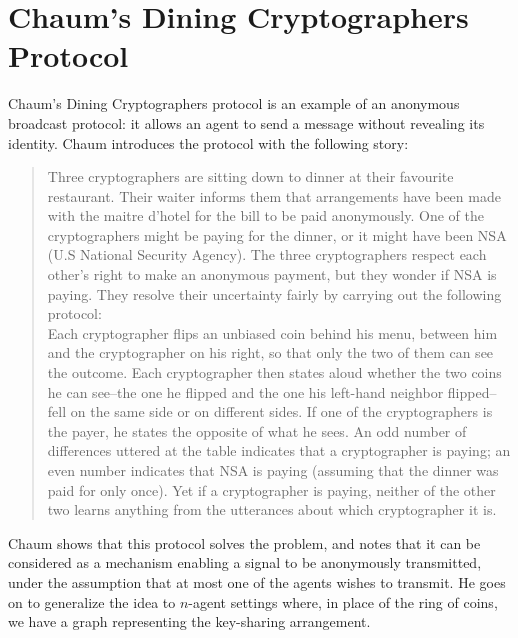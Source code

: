 \documentclass[]{llncs}
\begin{document}
\section{Chaum's Dining Cryptographers Protocol}\label{sec:DC} 

Chaum's Dining Cryptographers protocol is an example of an anonymous broadcast
protocol: it allows an agent to send a message without revealing
its  identity. Chaum introduces the protocol 
with the following story:

\begin{quote}
Three cryptographers are sitting down to dinner at their favourite restaurant.
Their waiter informs them that arrangements have been made with the maitre d'hotel
for the bill to be paid anonymously. One of the cryptographers might be paying for
the dinner, or it might have been NSA (U.S National Security Agency). The three
cryptographers respect each other's right to make an anonymous payment, but they
wonder if NSA is paying. They resolve their uncertainty fairly by carrying out the following protocol:\\
Each cryptographer flips an unbiased coin behind his menu, between him and the cryptographer on his right, so that only the two of them can see the outcome. Each cryptographer then states aloud whether the two coins he can see--the one he flipped and the one his left-hand neighbor flipped--fell on the same side or on different sides. If one of the cryptographers is the payer, he states the opposite of what he sees. An odd number of differences uttered at the table indicates that a cryptographer is paying; an even number indicates that NSA is paying (assuming that the dinner was paid for only once). Yet if a cryptographer is paying, neither of the other two learns anything from the utterances about which cryptographer it is.
\end{quote}

\newcommand{\inedges}{{\it in}} 
\newcommand{\outedges}{{\it out}} 

Chaum shows that this protocol solves the problem, and notes that it can be considered
as a mechanism enabling a signal to be anonymously transmitted, under the  
assumption that at most one of the agents wishes to transmit. 
He goes on to generalize the idea to $n$-agent settings where, in 
place of the ring of coins, we have a graph 
representing the key-sharing arrangement. 
\end{document}
